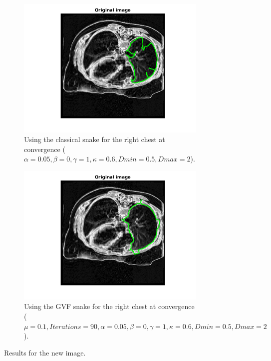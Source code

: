\documentclass{article}
\begin{document}
\begin{figure}[H]
\begin{subfigure}{0.45\textwidth}
  \includegraphics[width=\linewidth]{newRightclassical.png}
  \caption{Using the classical snake for the right chest at convergence ($\alpha=0.05, \beta=0, \gamma=1,\kappa=0.6,Dmin=0.5,Dmax=2$).}
  \label{e}
\end{subfigure}
\begin{subfigure}{0.45\textwidth}
  \centering
  \includegraphics[width=\linewidth]{newRightGFV.png}
  \caption{Using the GVF snake for the right chest at convergence ($\mu=0.1, Iterations=90, \alpha=0.05, \beta=0, \gamma=1,\kappa=0.6,Dmin=0.5,Dmax=2$).}
  \label{f}
\end{subfigure}
\caption{Results for the new image.}
\label{figurebla}
\end{figure}
\end{document}
